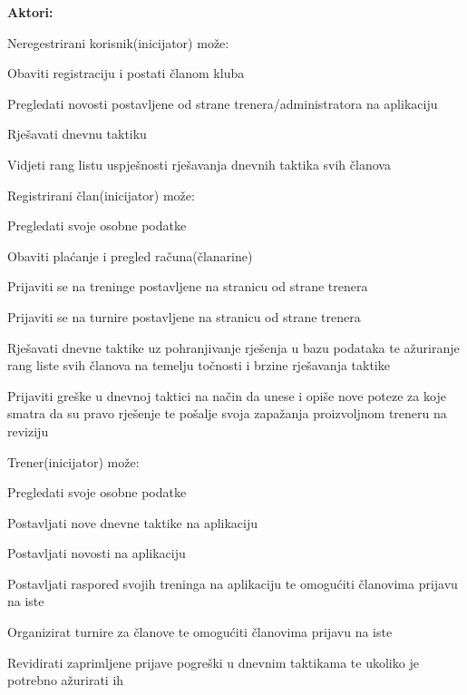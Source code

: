 \documentclass{article}
\begin{document}
		\noindent \textbf{Aktori:}
		\begin{packed_enum}
			\item Neregestrirani korisnik(inicijator) može:
			\begin{packed_enum}
				\item Obaviti registraciju i postati članom kluba 
				\item Pregledati novosti postavljene od strane trenera/administratora na aplikaciju 
				\item Rješavati dnevnu taktiku 
				\item Vidjeti rang listu uspješnosti rješavanja dnevnih taktika svih članova
			\end{packed_enum}
			\item Registrirani član(inicijator) može:
			\begin{packed_enum}
				\item Pregledati svoje osobne podatke 
				\item Obaviti plaćanje i pregled računa(članarine) 
				\item Prijaviti se na treninge postavljene na stranicu od strane trenera 
				\item Prijaviti se na turnire postavljene na stranicu od strane trenera
				\item Rješavati dnevne taktike uz pohranjivanje rješenja u bazu podataka te ažuriranje rang liste svih članova na temelju točnosti i brzine rješavanja taktike 
				\item Prijaviti greške u dnevnoj taktici na način da unese i opiše nove poteze za koje smatra da su pravo rješenje te pošalje svoja zapažanja proizvoljnom treneru na reviziju 
			\end{packed_enum}
			\item Trener(inicijator) može:
			\begin{packed_enum}
				\item Pregledati svoje osobne podatke 
				\item Postavljati nove dnevne taktike na aplikaciju 
				\item Postavljati novosti na aplikaciju 
				\item Postavljati raspored svojih treninga na aplikaciju te omogućiti članovima prijavu na iste 
				\item Organizirat turnire za članove te omogućiti članovima prijavu na iste 
				\item Revidirati zaprimljene prijave pogreški u dnevnim taktikama te ukoliko je potrebno ažurirati ih 
			\end{packed_enum}

\end{packed_enum}
\end{document}

